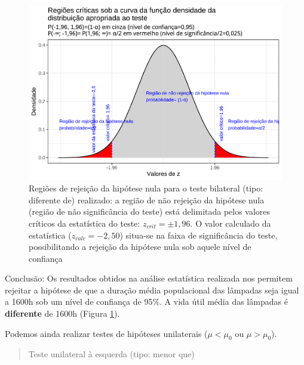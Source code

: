 \documentclass[
]{book}
\begin{document}
\begin{figure}

{\centering \includegraphics[width=1\linewidth]{apostila_files/figure-latex/fig73-1} 

}

\caption{Regiões de rejeição da hipótese nula para o teste bilateral (tipo: diferente de) realizado: a região de não rejeição da hipótese nula (região de não significância do teste) está delimitada pelos valores críticos da estatística do teste: $z_{crit} =\pm 1,96$. O valor calculado da estatística ($z_{calc}=-2,50$) situa-se na faixa de significância do teste, possibilitando a rejeição da hipótese nula sob aquele nível de confiança}\label{fig:fig73}
\end{figure}

\hfill\break

Conclusão: Os resultados obtidos na análise estatística realizada nos permitem rejeitar a hipótese de que a duração média populacional das lâmpadas seja igual a 1600h sob um nível de confiança de 95\%. A vida útil média das lâmpadas é \textbf{diferente} de 1600h (Figura \ref{fig:fig73}).

\hfill\break

\hfill\break

Podemos ainda realizar testes de hipóteses unilaterais (\(\mu<\mu_{0}\) ou \(\mu>\mu_{0}\)).

\hfill\break

\begin{quote}
Teste unilateral à esquerda (tipo: menor que)
\end{quote}

\hfill\break
\end{document}
